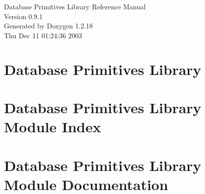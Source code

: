\documentclass[letterpaper]{book}
\begin{document}
\begin{titlepage}
\vspace*{7cm}
\begin{center}
{\Large Database Primitives Library Reference Manual\\[1ex]\large Version 0.9.1}\\
\vspace*{1cm}
{\large Generated by Doxygen 1.2.18}\\
\vspace*{0.5cm}
{\small Thu Dec 11 01:24:36 2003}\\
\end{center}
\end{titlepage}
\clearemptydoublepage
{}
\tableofcontents
\clearemptydoublepage
{}
\chapter{Database Primitives Library}
\label{index}\hypertarget{index}{}
\chapter{Database Primitives Library Module Index}

\chapter{Database Primitives Library Module Documentation}





\printindex
\end{document}
